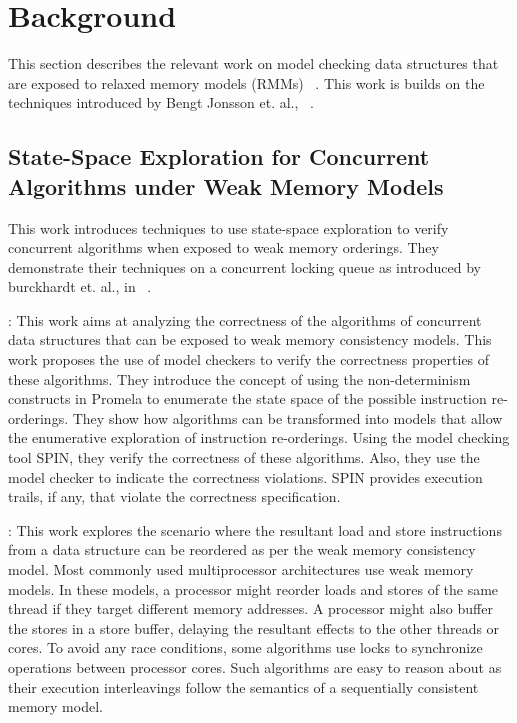 \section{Background}

This section describes the relevant work on model checking data structures that
are exposed to relaxed memory models (RMMs) ~\cite{burnim2011testing,
Jonsson:2009:SEC:1556444.1556453}. This work is builds on the techniques
introduced by Bengt Jonsson et. al., ~\cite{Jonsson:2009:SEC:1556444.1556453}.

\subsection{State-Space Exploration for Concurrent Algorithms under Weak Memory
 Models}

This work introduces techniques to use state-space exploration to verify
concurrent algorithms when exposed to weak memory orderings. They demonstrate
their techniques on a concurrent locking queue as introduced by burckhardt et.
al., in ~\cite{burckhardt2007checkfence, article}.

: This work aims at analyzing the correctness of the algorithms
of concurrent data structures that can be exposed to weak memory
consistency models. This work proposes the use of model checkers to verify
the correctness properties of these algorithms. They introduce the concept
of using the non-determinism constructs in Promela to enumerate the state space
of the possible instruction re-orderings. They show how algorithms can be
transformed into models that allow the enumerative exploration of instruction
re-orderings. Using the model checking tool SPIN, they verify the correctness
of these algorithms. Also, they use the model checker to indicate the correctness
violations. SPIN provides execution trails, if any, that violate the correctness
specification.

: This work explores the scenario where the resultant
load and store instructions from a data structure can be reordered as per the weak
memory consistency model. Most commonly used multiprocessor architectures use weak
memory models. In these models, a processor might reorder loads and stores of the
same thread if they target different memory addresses. A processor might also buffer
the stores in a store buffer, delaying the resultant effects to the other threads or
cores. To avoid any race conditions, some algorithms use locks to synchronize
operations between processor cores. Such algorithms are easy to reason about
as their execution interleavings follow the semantics of a sequentially consistent
memory model.

